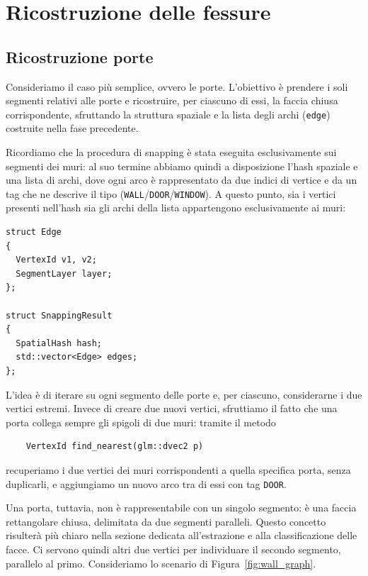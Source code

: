 \section{Ricostruzione delle fessure}
\label{sec:gap_reconstruction}

\subsection{Ricostruzione porte}

Consideriamo il caso più semplice, ovvero le porte. L'obiettivo è prendere i soli segmenti relativi alle porte e ricostruire, per ciascuno di essi, la faccia chiusa corrispondente, sfruttando la struttura spaziale e la lista degli archi (\texttt{edge}) costruite nella fase precedente.

Ricordiamo che la procedura di snapping è stata eseguita esclusivamente sui segmenti dei muri: al suo termine abbiamo quindi a disposizione l'hash spaziale e una lista di archi, dove ogni arco è rappresentato da due indici di vertice e da un tag che ne descrive il tipo (\texttt{WALL}/\texttt{DOOR}/\texttt{WINDOW}). A questo punto, sia i vertici presenti nell'hash sia gli archi della lista appartengono esclusivamente ai muri:
\begin{verbatim} 
struct Edge
{
  VertexId v1, v2;
  SegmentLayer layer;
};

struct SnappingResult
{
  SpatialHash hash;
  std::vector<Edge> edges;
};
\end{verbatim}

L'idea è di iterare su ogni segmento delle porte e, per ciascuno, considerarne i due vertici estremi. Invece di creare due nuovi vertici, sfruttiamo il fatto che una porta collega sempre gli spigoli di due muri: tramite il metodo

\begin{verbatim}
	VertexId find_nearest(glm::dvec2 p)
\end{verbatim}

recuperiamo i due vertici dei muri corrispondenti a quella specifica porta, senza duplicarli, e aggiungiamo un nuovo arco tra di essi con tag \texttt{DOOR}.

Una porta, tuttavia, non è rappresentabile con un singolo segmento: è una faccia rettangolare chiusa, delimitata da due segmenti paralleli. Questo concetto risulterà più chiaro nella sezione dedicata all'estrazione e alla classificazione delle facce. Ci servono quindi altri due vertici per individuare il secondo segmento, parallelo al primo. Consideriamo lo scenario di Figura~\ref{fig:wall_graph}.

